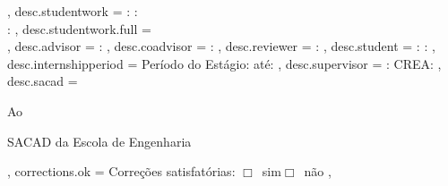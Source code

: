 {{\begin{description}
                            \end{description}
                              } ,
  desc.studentwork          = { 
                              \noindent{}: {\bf {}}\hfill {}: {\bf {}}\\%
                              \noindent{}:  } , 
  desc.studentwork.full     = {\\[2.5mm]} ,  
  desc.advisor              = {\noindent{}:  \textbf{}} ,
  desc.coadvisor            = {\noindent{}:  \textbf{}} ,
  desc.reviewer             = {\noindent{}:  \textbf{}} ,
  desc.student              = {\noindent{}: {\bf {}}\hfill 
                              : {\bf {}}} ,
  desc.internshipperiod     = {\noindent Período do Estágio: {\bf {}} até: {\bf {}}} ,
  desc.supervisor           = {: \textbf{} \hfill CREA: \textbf{}} ,
  desc.sacad                = {\noindent Ao\par\noindent SACAD da Escola de Engenharia} ,
  corrections.ok            = {Correções satisfatórias: \hspace*{1cm}$\Box$\ sim\hspace*{2cm}$\Box$\ não} , 
}



